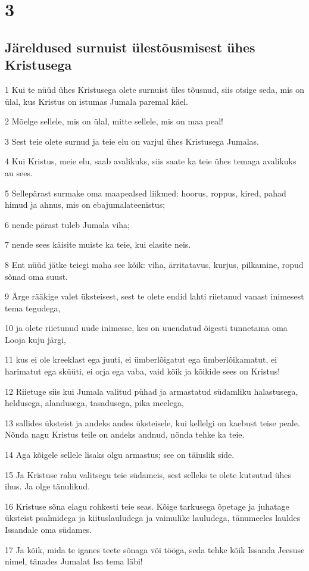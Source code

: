 \chapter{3}

\section*{Järeldused surnuist ülestõusmisest ühes Kristusega}

\par 1 Kui te nüüd ühes Kristusega olete surnuist üles tõusnud, siis otsige seda, mis on ülal, kus Kristus on istumas Jumala paremal käel.
\par 2 Mõelge sellele, mis on ülal, mitte sellele, mis on maa peal!
\par 3 Sest teie olete surnud ja teie elu on varjul ühes Kristusega Jumalas.
\par 4 Kui Kristus, meie elu, saab avalikuks, siis saate ka teie ühes temaga avalikuks au sees.
\par 5 Sellepärast surmake oma maapealsed liikmed: hoorus, roppus, kired, pahad himud ja ahnus, mis on ebajumalateenistus;
\par 6 nende pärast tuleb Jumala viha;
\par 7 nende sees käisite muiste ka teie, kui elasite neis.
\par 8 Ent nüüd jätke teiegi maha see kõik: viha, ärritatavus, kurjus, pilkamine, ropud sõnad oma suust.
\par 9 Ärge rääkige valet üksteisest, sest te olete endid lahti riietanud vanast inimesest tema tegudega,
\par 10 ja olete riietunud uude inimesse, kes on uuendatud õigesti tunnetama oma Looja kuju järgi,
\par 11 kus ei ole kreeklast ega juuti, ei ümberlõigatut ega ümberlõikamatut, ei harimatut ega sküüti, ei orja ega vaba, vaid kõik ja kõikide sees on Kristus!
\par 12 Riietuge siis kui Jumala valitud pühad ja armastatud südamliku halastusega, heldusega, alandusega, tasadusega, pika meelega,
\par 13 sallides üksteist ja andeks andes üksteisele, kui kellelgi on kaebust teise peale. Nõnda nagu Kristus teile on andeks andnud, nõnda tehke ka teie.
\par 14 Aga kõigele sellele lisaks olgu armastus; see on täiuslik side.
\par 15 Ja Kristuse rahu valitsegu teie südameis, sest selleks te olete kutsutud ühes ihus. Ja olge tänulikud.
\par 16 Kristuse sõna elagu rohkesti teie seas. Kõige tarkusega õpetage ja juhatage üksteist psalmidega ja kiituslauludega ja vaimulike lauludega, tänumeeles lauldes Issandale oma südames.
\par 17 Ja kõik, mida te iganes teete sõnaga või tööga, seda tehke kõik Issanda Jeesuse nimel, tänades Jumalat Isa tema läbi!

